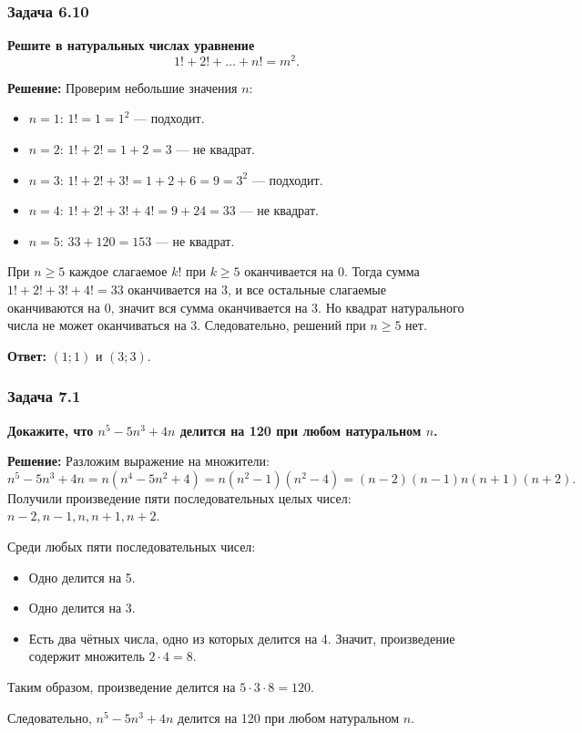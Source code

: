 \documentclass[12pt, a4paper]{article}
\begin{document}
\subsubsection*{Задача 6.10}
\textbf{Решите в натуральных числах уравнение}
\[
1! + 2! + \dots + n! = m^2.
\]

\textbf{Решение:}
Проверим небольшие значения $n$:
\begin{itemize}
    \item $n = 1$: $1! = 1 = 1^2$ — подходит.
    \item $n = 2$: $1! + 2! = 1 + 2 = 3$ — не квадрат.
    \item $n = 3$: $1! + 2! + 3! = 1 + 2 + 6 = 9 = 3^2$ — подходит.
    \item $n = 4$: $1! + 2! + 3! + 4! = 9 + 24 = 33$ — не квадрат.
    \item $n = 5$: $33 + 120 = 153$ — не квадрат.
\end{itemize}

При $n \ge 5$ каждое слагаемое $k!$ при $k \ge 5$ оканчивается на 0. Тогда сумма $1! + 2! + 3! + 4! = 33$ оканчивается на 3, и все остальные слагаемые оканчиваются на 0, значит вся сумма оканчивается на 3. Но квадрат натурального числа не может оканчиваться на 3. Следовательно, решений при $n \ge 5$ нет.

\textbf{Ответ:} $(1; 1)$ и $(3; 3)$.

\subsubsection*{Задача 7.1}
\textbf{Докажите, что $n^5 - 5n^3 + 4n$ делится на 120 при любом натуральном $n$.}

\textbf{Решение:}
Разложим выражение на множители:
\[
n^5 - 5n^3 + 4n = n(n^4 - 5n^2 + 4) = n(n^2 - 1)(n^2 - 4) = (n-2)(n-1)n(n+1)(n+2).
\]
Получили произведение пяти последовательных целых чисел: $n-2, n-1, n, n+1, n+2$.

Среди любых пяти последовательных чисел:
\begin{itemize}
    \item Одно делится на 5.
    \item Одно делится на 3.
    \item Есть два чётных числа, одно из которых делится на 4. Значит, произведение содержит множитель $2 \cdot 4 = 8$.
\end{itemize}
Таким образом, произведение делится на $5 \cdot 3 \cdot 8 = 120$.

Следовательно, $n^5 - 5n^3 + 4n$ делится на 120 при любом натуральном $n$.
\end{document}
